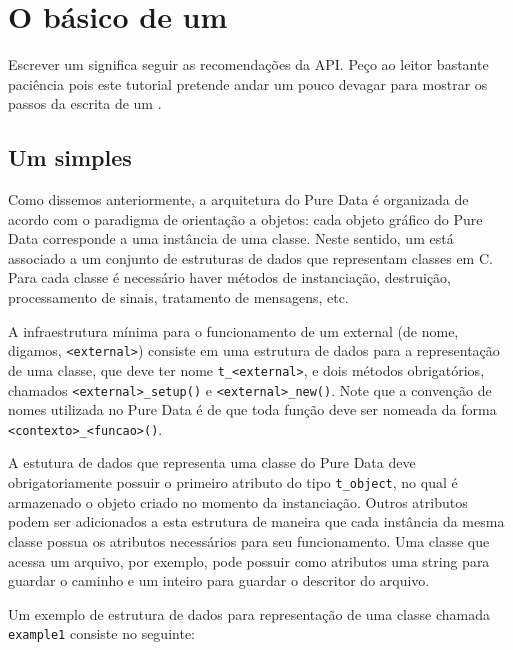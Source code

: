 
\chapter{O básico de um \external}

Escrever um \external significa seguir as recomendações da API. Peço ao leitor
bastante paciência pois este tutorial pretende andar um pouco devagar para
mostrar os passos da escrita de um \external.

\section{Um \external simples}

Como dissemos anteriormente, a arquitetura do Pure Data é organizada de acordo
com o paradigma de orientação a objetos: cada objeto gráfico do Pure Data
corresponde a uma instância de uma classe. Neste sentido, um \external está
associado a um conjunto de estruturas de dados que representam classes em C.
Para cada classe é necessário haver métodos de instanciação, destruição,
processamento de sinais, tratamento de mensagens, etc.

A infraestrutura mínima para o funcionamento de um external (de nome, digamos,
\texttt{<external>}) consiste em uma estrutura de dados para a representação
de uma classe, que deve ter nome \texttt{t\_<external>}, e dois métodos
obrigatórios, chamados \texttt{<external>\_setup()} e
\texttt{<external>\_new()}. Note que a convenção de nomes utilizada no Pure
Data é de que toda função deve ser nomeada da forma
\texttt{<contexto>\_<funcao>()}.

A estutura de dados que representa uma classe do Pure Data deve
obrigatoriamente possuir o primeiro atributo do tipo \texttt{t\_object}, no
qual é armazenado o objeto criado no momento da instanciação.  Outros
atributos podem ser adicionados a esta estrutura de maneira que cada instância
da mesma classe possua os atributos necessários para seu funcionamento. Uma
classe que acessa um arquivo, por exemplo, pode possuir como atributos uma
string para guardar o caminho e um inteiro para guardar o descritor do
arquivo.

Um exemplo de estrutura de dados para representação de uma classe chamada
\texttt{example1} consiste no seguinte:

